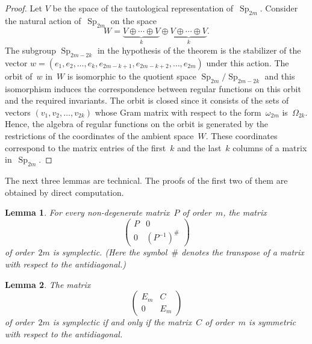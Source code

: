 \documentclass[12pt]{amsart}
\newtheorem{lemma}{Lemma}
\theoremstyle{definition}
\theoremstyle{remark}
\begin{document}
\begin{proof}
Let $V$ be the space of the tautological representation
of~${\operatorname{Sp}}_{2m}$. Consider the natural action of~${\operatorname{Sp}}_{2m}$ on the
space
$$
W=\underbrace{V\oplus \cdots \oplus V}_k \oplus \underbrace{V\oplus
\cdots \oplus V}_k.
$$
The subgroup ${\operatorname{Sp}}_{2m-2k}$ in the hypothesis of the theorem is the
stabilizer of the vector $w=(e_1,e_2,\dots,e_k,
e_{2m-k+1},e_{2m-k+2},\dots,e_{2m})$ under this action. The orbit
of~$w$ in~$W$ is isomorphic to the quotient space
${\operatorname{Sp}}_{2m}/{\operatorname{Sp}}_{2m-2k}$ and this isomorphism induces the
correspondence between regular functions on this orbit and the
required invariants. The orbit is closed since it consists of the
sets of vectors $(v_1,v_2,\dots,v_{2k})$ whose Gram matrix with
respect to the form~$\omega_{2m}$ is~$\Omega_{2k}$. Hence, the
algebra of regular functions on the orbit is generated by the
restrictions of the coordinates of the ambient space~$W$. These
coordinates correspond to the matrix entries of the first~$k$ and
the last~$k$ columns of a matrix in~${\operatorname{Sp}}_{2m}$.
\end{proof}

The next three lemmas are technical. The proofs of the first two of
them are obtained by direct computation.

\begin{lemma}
\label{lem2} For every non-degenerate matrix~$P$ of order~$m$, the
matrix
\begin{equation}
\label{eq1}
\begin{pmatrix}
P & 0
\\
0 & (P^{-1})^{\#}
\end{pmatrix}
\end{equation}
of order~$2m$ is symplectic. \textup{(}Here the symbol~$\#$ denotes
the transpose of a matrix with respect to the
antidiagonal.\textup{)}
\end{lemma}

\begin{lemma}
The matrix
\begin{equation}
\label{eq2}
\begin{pmatrix}
E_m & C
\\
0 & E_m
\end{pmatrix}
\end{equation}
of order~$2m$ is symplectic if and only if the matrix~$C$ of
order~$m$ is symmetric with respect to the antidiagonal.
\end{lemma}
\end{document}
